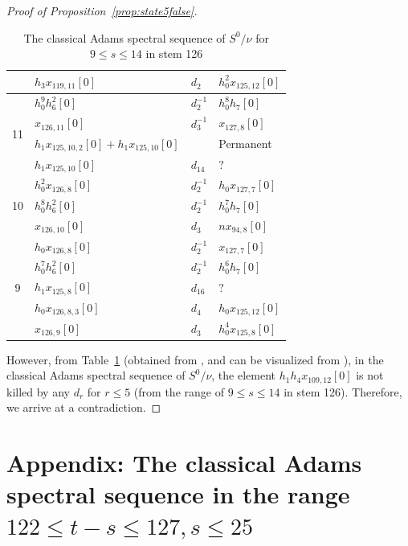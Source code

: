 \documentclass{amsart}
\numberwithin{equation}{section}
\begin{document}
\begin{proof}[Proof of Proposition~\ref{prop:state5false}]
\begin{table}[h]
{\begin{tabular}{|c|l|l|l|}
 & $h_3x_{119,11}[0]$ & $d_{2}$ & $h_0^2x_{125,12}[0]$ \\\hline\hline
\multirow{4}{*}{11} & $h_0^9h_6^2[0]$ & $d_{2}^{-1}$ & $h_0^8h_7[0]$ \\\cline{2-4}
 & $x_{126,11}[0]$ & $d_{3}^{-1}$ & $x_{127,8}[0]$ \\\cline{2-4}
 & $h_1x_{125,10,2}[0]+h_1x_{125,10}[0]$ & & Permanent \\\cline{2-4}
 & $h_1x_{125,10}[0]$ & $d_{14}$ & $?$ \\\hline\hline
\multirow{3}{*}{10} & $h_0^2x_{126,8}[0]$ & $d_{2}^{-1}$ & $h_0x_{127,7}[0]$ \\\cline{2-4}
 & $h_0^8h_6^2[0]$ & $d_{2}^{-1}$ & $h_0^7h_7[0]$ \\\cline{2-4}
 & $x_{126,10}[0]$ & $d_{3}$ & $nx_{94,8}[0]$ \\\hline\hline
\multirow{5}{*}{9} & $h_0x_{126,8}[0]$ & $d_{2}^{-1}$ & $x_{127,7}[0]$ \\\cline{2-4}
 & $h_0^7h_6^2[0]$ & $d_{2}^{-1}$ & $h_0^6h_7[0]$ \\\cline{2-4}
 & $h_1x_{125,8}[0]$ & $d_{16}$ & $?$ \\\cline{2-4}
 & $h_0x_{126,8,3}[0]$ & $d_{4}$ & $h_0x_{125,12}[0]$ \\\cline{2-4}
 & $x_{126,9}[0]$ & $d_{3}$ & $h_0^4x_{125,8}[0]$ \\\hline %
\end{tabular}}
\caption{The classical Adams spectral sequence of $S^0/\nu$ for $9 \le s \le 14$ in stem 126}
\label{Table:Cnu126}
\end{table}


However, from Table~\ref{Table:Cnu126} (obtained from \cite{LWXMachine} \cite{LWXZenodo}, and can be visualized from \cite{LinPlot}), in the classical Adams spectral sequence of $S^0/\nu$, the element  $h_1h_4x_{109,12}[0]$ is not killed by any $d_r$ for $r \leq 5$ (from the range of $9 \le s \le 14$ in stem 126). Therefore, we arrive at a contradiction.
\end{proof}



\section{Appendix: The classical Adams spectral sequence in the range $122 \le t-s \le 127, s \le 25$} \label{sec:App}
\end{document}

